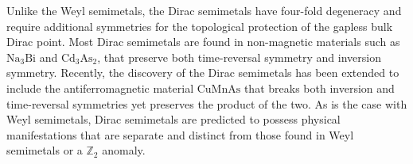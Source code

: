 Unlike the Weyl semimetals, the Dirac semimetals have four-fold degeneracy and require additional symmetries for the topological protection of the gapless bulk Dirac point. Most Dirac semimetals are found in non-magnetic materials such as $\mathrm{Na_3Bi}$\cite{Liu864,PhysRevB.85.195320,Liu864,Xu294,Xiong413} and $\mathrm{Cd_3 As_2}$\cite{Liu2014,PhysRevB.88.125427,Neupane2014,PhysRevLett.113.027603,Jeon2014,Liang2014,PhysRevLett.113.246402,PhysRevLett.115.226401,PhysRevB.92.081306,Li2015,Li2016,Guo2016,Zhang2017}, that preserve both time-reversal symmetry and inversion symmetry. Recently, the discovery of the Dirac semimetals has been extended to include the antiferromagnetic material $\mathrm{CuMnAs}$ that breaks both inversion and time-reversal symmetries yet preserves the product of the two\cite{Tang2016}. As is the case with Weyl semimetals, Dirac semimetals are predicted to possess physical manifestations that are separate and distinct from those found in Weyl semimetals or a $\mathbb{Z}_2$ anomaly\cite{PhysRevLett.117.136602,Xiong413}.

